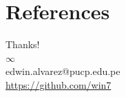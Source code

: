 \documentclass[aspectratio=169]{beamer}
\begin{document}

    

\section*{References}
    \begin{frame}
        \begin{center}
            {\Huge\calligra Thanks!} \\
            {\Huge $\infty$} \\
            edwin.alvarez@pucp.edu.pe \\
            \url{https://github.com/win7}
        \end{center}
    \end{frame}
    
    \begin{frame}[allowframebreaks]
        \footnotesize %
        
        
        
    \end{frame}
\end{document}
